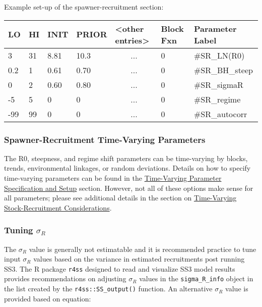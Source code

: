 Example set-up of the spawner-recruitment section:
\begin{center}
	\begin{longtable}{p{1cm} p{1cm} p{1cm} p{1.5cm} p{3cm} p{2cm} p{3.5cm}}
		
		\hline
		LO \Tstrut & HI & INIT & PRIOR & <other entries> & Block Fxn & Parameter Label \Bstrut\\
		\hline
		3   & 31 & 8.81 & 10.3 & \multicolumn{1}{c}{...} & 0 & \#SR\_LN(R0) \Tstrut\\
		0.2 & 1  & 0.61 & 0.70 & \multicolumn{1}{c}{...} & 0 & \#SR\_BH\_steep \\
		0   & 2  & 0.60 & 0.80 & \multicolumn{1}{c}{...} & 0 & \#SR\_sigmaR \\
		-5  & 5  & 0    & 0    & \multicolumn{1}{c}{...} & 0 & \#SR\_regime \\
		-99 & 99 & 0    & 0    & \multicolumn{1}{c}{...} & 0 & \#SR\_autocorr \Bstrut\\
		\hline
	\end{longtable}
\end{center}
\vspace*{-1.7\baselineskip}

\subsubsection{Spawner-Recruitment Time-Varying Parameters}

The R0, steepness, and regime shift parameters can be time-varying by blocks, trends, environmental linkages, or random deviations. Details on how to specify time-varying parameters can be found in the \hyperlink{tvOrder}{Time-Varying Parameter Specification and Setup} section. However, not all of these options make sense for all parameters; please see additional details in the section on \hyperlink{tv-sr}{Time-Varying Stock-Recruitment Considerations}.

\subsubsection{Tuning $\sigma_R$}
\hyperlink{TuneSigmaR}{}
The $\sigma_R$ value is generally not estimatable and it is recommended practice to tune input $\sigma_R$ values based on the variance in estimated recruitments post running SS3. The R package \texttt{r4ss} designed to read and visualize SS3 model results provides recommendations on adjusting $\sigma_R$ values in the \texttt{sigma\_R\_info} object in the list created by the \texttt{r4ss::SS\_output()} function. An alternative $\sigma_R$ value is provided based on equation:

